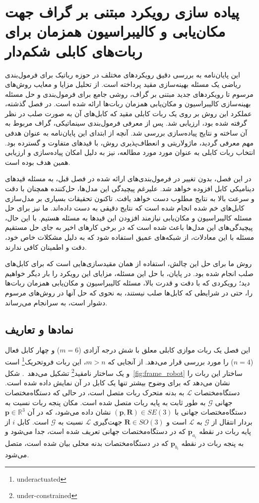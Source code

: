 \chapter{پیاده سازی رویکرد مبتنی بر گراف جهت مکان‌یابی و کالیبراسیون همزمان برای ربات‌های کابلی شکم‌دار}
این پایان‌نامه به بررسی دقیق رویکردهای مختلف در حوزه رباتیک برای فرمول‌بندی ریاضی یک مسئله بهینه‌سازی مقید پرداخته است. از تحلیل مزایا و معایب روش‌های مرسوم تا رویکردهای جدید مبتنی بر گراف، روشی جامع برای فرمول‌بندی و حل مسئله بهینه‌سازی کالیبراسیون و مکان‌یابی همزمان ربات‌ها ارائه شده است. در فصل گذشته، عملکرد این روش بر روی یک ربات کابلی مقید که کابل‌های آن به صورت صلب در نظر گرفته شده بود، ارزیابی شد. پس از معرفی فرمول‌بندی سینماتیکی، گراف مربوط به آن ساخته و نتایج پیاده‌سازی بررسی شد. آنچه از ابتدای این پایان‌نامه به عنوان هدفی مهم معرفی گردید، ماژولاریتی و انعطاف‌پذیری روش، با قیدهای متفاوت و گسترده بود. انتخاب ربات کابلی به عنوان مورد مورد مطالعه، نیز به دلیل امکان پیاده‌سازی و ارزیابی همین هدف بوده است.

در این فصل، بدون تغییر در فرمول‌بندی‌های ارائه شده در فصل قبل، به مسئله قیدهای دینامیکی کابل افزوده خواهد شد. علیرغم پیچیدگی این مدل‌ها، حل‌کننده همچنان با دقت و سرعت بالا به نتایج مطلوب دست خواهد یافت. تاکنون تحقیقات بسیاری بر مدل‌سازی کابل‌های خم شده انجام شده است که نتایج دقیقی به دست داده‌اند. ما نیز برای حل مسئله کالیبراسیون و مکان‌یابی نیازمند افزودن این قیدها به مسئله هستیم. با این حال، پیچیدگی‌های این مدل‌ها باعث شده است که در برخی کارهای اخیر به جای حل مستقیم مسئله با این معادلات، از شبکه‌های عمیق استفاده شود که به دلیل مشکلات خاص خود، دقت و اطمینان کافی ندارند.

روش ما برای حل این چالش، استفاده از همان مقیدسازی‌هایی است که برای کابل‌های صلب انجام شده بود. در پایان، با حل این مسئله، مزایای این رویکرد را بار دیگر خواهیم دید؛ رویکردی که با دقت و قدرت بالا، مسئله کالیبراسیون و مکان‌یابی همزمان ربات‌ها را، حتی در شرایطی که کابل‌ها صلب نیستند، به نحوی که حل آنها در روش‌های مرسوم دشوار است، به سرانجام می‌رساند.



\section{نمادها و تعاریف} \label{subsec:Assm}
این فصل یک ربات موازی کابلی معلق با شش درجه آزادی ($m=6$) و چهار کابل فعال ($n=4$) را مورد بررسی قرار می‌دهد. از آنجایی که $m>n$، این ربات فروتحریک\footnote{underactuated}
 است و یک ساختار نامقید\footnote{under-constrained}
تشکیل می‌دهد~\cite{ida2021natural}. 
شکل~\ref{fig:frame_robot} ساختار این ربات را نشان می‌دهد که برای وضوح بیشتر تنها یک کابل در آن نمایش داده شده است. 
دستگاه‌مختصات $\mathcal{L}$ به بدنه متحرک ربات متصل است، در حالی که دستگاه‌مختصات جهانی $\mathcal{G}$ به طور ثابت به پایه ربات متصل شده است. مکان پنجه ربات نسبت به دستگاه‌مختصات جهانی با
 $(\bm{p},\bm{R}) \in SE(3)$
نشان داده می‌شود، که در آن
 $\bm{p} \in \mathbb{R}^3$
بردار انتقال از $\mathcal{G}$ به $\mathcal{L}$ است و
 $\bm{R} \in SO(3)$
جهت‌گیری $\mathcal{L}$ نسبت به $\mathcal{G}$ است. کابل $i$ از پایه ربات در نقطه $\bm{p}_{a_i}$ که در دستگاه‌مختصات جهانی تعریف شده است، جدا می‌شود و به پنجه ربات در نقطه $\bm{p}_{b_i}$ که در دستگاه‌مختصات بدنه محلی بیان شده است، متصل می‌شود.


